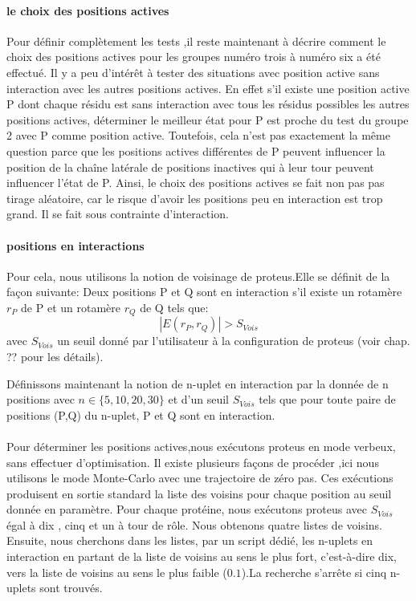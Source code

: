 \paragraph{le choix des positions actives}
\label{para:choix_posi}
Pour définir complètement les tests ,il reste maintenant à décrire comment le choix des positions actives pour les groupes numéro trois à numéro six a été effectué.
Il y a peu d'intérêt à tester des situations avec position active sans interaction avec les autres positions actives. 
En effet s'il existe une position active P dont chaque résidu est sans interaction avec tous les résidus possibles les autres positions actives, déterminer le meilleur état pour P est proche du test du groupe 2 avec P comme position active. Toutefois, cela n'est pas exactement la même question parce que les positions actives différentes de P peuvent influencer la position de la chaîne latérale de positions inactives qui à leur tour peuvent influencer l'état de P.
Ainsi, le choix des positions actives se fait non pas pas tirage aléatoire, car le risque d'avoir les positions peu en interaction est trop grand. Il se fait sous contrainte d'interaction.

\paragraph{positions en interactions}
Pour cela, nous utilisons la notion de voisinage de proteus.Elle se définit de la façon suivante:  
Deux positions P et Q sont en interaction s'il existe un rotamère $r_P$ de P et un rotamère $r_Q$ de Q tels que:
\begin{displaymath}
 | E(r_P,r_Q) | > S_{Vois}
\end{displaymath} 
avec $S_{Vois}$ un seuil donné par l'utilisateur à la configuration de proteus (voir chap. ?? pour les détails).

Définissons maintenant la notion de n-uplet en interaction par la donnée de n positions avec $n \in \{5,10,20,30\}$ et d'un seuil  $S_{Vois}$  tels que pour toute paire de positions (P,Q) du n-uplet, P et Q sont en interaction.
\paragraph{}
Pour déterminer les positions actives,nous exécutons proteus en mode verbeux, sans effectuer d'optimisation.
Il existe plusieurs façons de procéder ,ici nous utilisons le mode Monte-Carlo avec une trajectoire de zéro pas. Ces exécutions produisent en sortie standard la liste des voisins pour chaque position au seuil donnée en paramètre.
Pour chaque protéine, nous exécutons proteus avec  $S_{Vois}$ égal à dix , cinq et un à tour de rôle. Nous obtenons quatre listes de voisins. 
Ensuite, nous cherchons dans les listes, par un script dédié, les n-uplets en interaction en partant de la liste de voisins au sens le plus fort, c'est-à-dire dix, vers la liste de voisins au sens le plus faible ($0.1$).La recherche s'arrête si cinq n-uplets sont trouvés.

